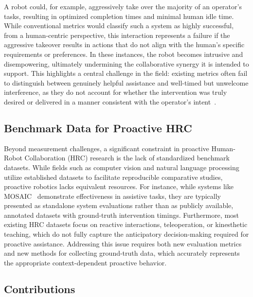 \documentclass[11pt, a4paper]{article}
\begin{document}
A robot could, for example, aggressively take over the majority of an operator's tasks, resulting in optimized completion times and minimal human idle time. While conventional metrics would classify such a system as highly successful, from a human-centric perspective, this interaction represents a failure if the aggressive takeover results in actions that do not align with the human's specific requirements or preferences. In these instances, the robot becomes intrusive and disempowering, ultimately undermining the collaborative synergy it is intended to support. This highlights a central challenge in the field: existing metrics often fail to distinguish between genuinely helpful assistance and well-timed but unwelcome interference, as they do not account for whether the intervention was truly desired or delivered in a manner consistent with the operator’s intent~\cite{Makris2023, Cotta2023}.

\subsection{Benchmark Data for Proactive HRC}

Beyond measurement challenges, a significant constraint in proactive Human-Robot Collaboration (HRC) research is the lack of standardized benchmark datasets. While fields such as computer vision and natural language processing utilize established datasets to facilitate reproducible comparative studies, proactive robotics lacks equivalent resources. For instance, while systems like MOSAIC~\cite{Wang2024} demonstrate effectiveness in assistive tasks, they are typically presented as standalone system evaluations rather than as publicly available, annotated datasets with ground-truth intervention timings. Furthermore, most existing HRC datasets focus on reactive interactions, teleoperation, or kinesthetic teaching, which do not fully capture the anticipatory decision-making required for proactive assistance. Addressing this issue requires both new evaluation metrics and new methods for collecting ground-truth data, which accurately represents the appropriate context-dependent proactive behavior.

\subsection{Contributions}
\end{document}
